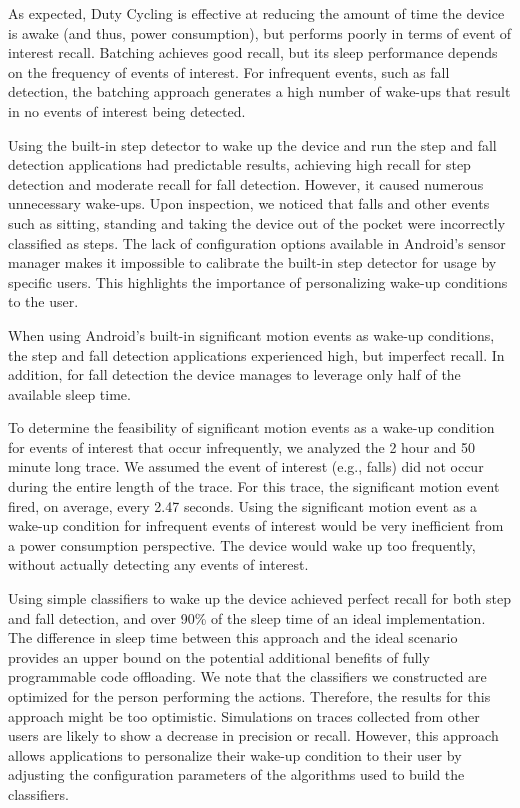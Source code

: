 As expected, Duty Cycling is effective at reducing the amount of time
the device is awake (and thus, power consumption), but performs poorly
in terms of event of interest recall.  Batching achieves
good recall, but its sleep performance depends on the frequency of
events of interest.  For infrequent events, such as fall
detection, the batching approach generates a high number 
of wake-ups that result in no events of interest being detected.

Using the built-in step detector to wake up the device and run the step 
and fall detection applications had predictable results, achieving high
recall for step detection and moderate recall for fall detection. However,
it caused numerous unnecessary wake-ups.  Upon inspection, we noticed that 
falls and other events such as sitting, standing and taking the device 
out of the pocket were incorrectly classified as steps.  The lack of 
configuration options available in Android's sensor manager makes it 
impossible to calibrate the built-in step detector for usage by specific 
users.  This highlights the importance of personalizing wake-up
conditions to the user.

When using Android's built-in significant motion events as wake-up
conditions, the step and fall detection applications experienced high,
but imperfect recall.  In addition, for fall detection the device
manages to leverage only half of the available sleep time.

To determine the feasibility of significant motion events 
as a wake-up condition for events of interest that occur infrequently, we 
analyzed the 2 hour and 50 minute long trace.  We assumed the event of 
interest (e.g., falls) did not occur during the entire length of the 
trace.  For this trace, the significant motion event fired, on average, 
every 2.47 seconds.  Using the significant motion event as a wake-up 
condition for infrequent events of interest would be very inefficient from a 
power consumption perspective.  The device would wake up too
frequently, without actually detecting any events of interest.

Using simple classifiers to wake up the device achieved perfect recall
for both step and fall detection, and over 90\% of the sleep time of
an ideal implementation.  The difference in sleep time between this
approach and the ideal scenario provides an upper bound on the
potential additional benefits of fully programmable code offloading.
We note that the classifiers we constructed are optimized for the
person performing the actions.  Therefore, the results for this
approach might be too optimistic.  Simulations on traces collected
from other users are likely to show a decrease in precision or recall.
However, this approach allows applications to personalize their
wake-up condition to their user by adjusting the configuration
parameters of the algorithms used to build the classifiers.






 